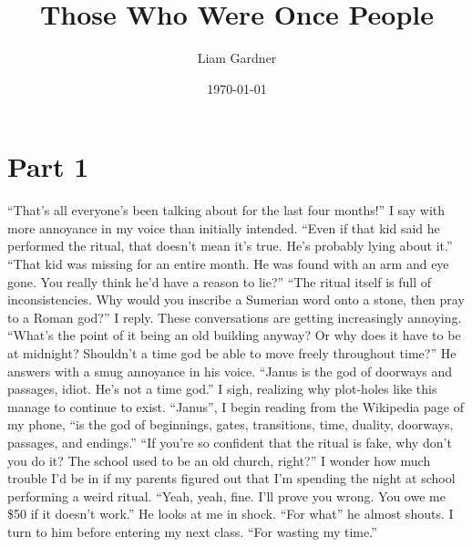 \documentclass[a4paper, 12pt]{book}
\title{Those Who Were Once People}
\author{Liam Gardner}
\date{\today}
\newcommand\tab[1][1cm]{\hspace*{#1}}
\begin{document}
\newcommand{\AmaGi}{$\stackrel{\hbox{\fontsize{15}{60}\selectfont ama-gi}}{\hbox{\fontsize{30}{60}\selectfont {\symbol{"120BC}\symbol{"12104}}}}$}




\maketitle
\section*{Part 1}
\tab
``That’s all everyone’s been talking about for the last four months!'' I say with more annoyance in my voice than initially intended. ``Even if that kid said he performed the ritual, that doesn’t mean it’s true. He’s probably lying about it.''
\newline
\tab
``That kid was missing for an entire month. He was found with an arm and eye gone. You really think he’d have a reason to lie?'' 
\newline
\tab
``The ritual itself is full of inconsistencies. Why would you inscribe a Sumerian word onto a stone, then pray to a Roman god?'' I reply. These conversations are getting increasingly annoying. ``What’s the point of it being an old building anyway? Or why does it have to be at midnight? Shouldn’t a time god be able to move freely throughout time?''
\newline
\tab
He answers with a smug annoyance in his voice. ``Janus is the god of doorways and passages, idiot. He’s not a time god.''
\newline
\tab
I sigh, realizing why plot-holes like this manage to continue to exist. ``Janus'', I begin reading from the Wikipedia page of my phone, ``is the god of beginnings, gates, transitions, time, duality, doorways, passages, and endings.''
\newline
\tab
``If you’re so confident that the ritual is fake, why don’t you do it? The school used to be an old church, right?''
\newline
\tab
I wonder how much trouble I’d be in if my parents figured out that I’m spending the night at school performing a weird ritual. ``Yeah, yeah, fine. I’ll prove you wrong. You owe me \$50 if it doesn’t work.''
\newline
\tab
He looks at me in shock. ``For what\textinterrobang'' he almost shouts.
\newline
\tab
I turn to him before entering my next class. ``For wasting my time.''
\newline
\end{document}
